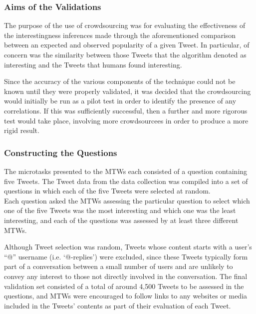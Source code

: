 \subsubsection{Aims of the Validations}
The purpose of the use of crowdsourcing was for evaluating the effectiveness of the interestingness inferences made through the aforementioned comparison between an expected and observed popularity of a given Tweet. In particular, of concern was the similarity between those Tweets that the algorithm denoted as interesting and the Tweets that humans found interesting.

Since the accuracy of the various components of the technique could not be known until they were properly validated, it was decided that the crowdsourcing would initially be run as a pilot test in order to identify the presence of any correlations. If this was sufficiently successful, then a further and more rigorous test would take place, involving more crowdsourcees in order to produce a more rigid result.


\subsubsection{Constructing the Questions}
The microtasks presented to the MTWs each consisted of a question containing five Tweets. The Tweet data from the data collection was compiled into a set of questions in which each of the five Tweets were selected at random.\\
Each question asked the MTWs assessing the particular question to select which one of the five Tweets was the most interesting and which one was the least interesting, and each of the questions was assessed by at least three different MTWs.

Although Tweet selection was random, Tweets whose content starts with a user's ``@'' username (i.e. `@-replies') were excluded, since these Tweets typically form part of a conversation between a small number of users and are unlikely to convey any interest to those not directly involved in the conversation. The final validation set consisted of a total of around 4,500 Tweets to be assessed in the questions, and MTWs were encouraged to follow links to any websites or media included in the Tweets' contents as part of their evaluation of each Tweet.


